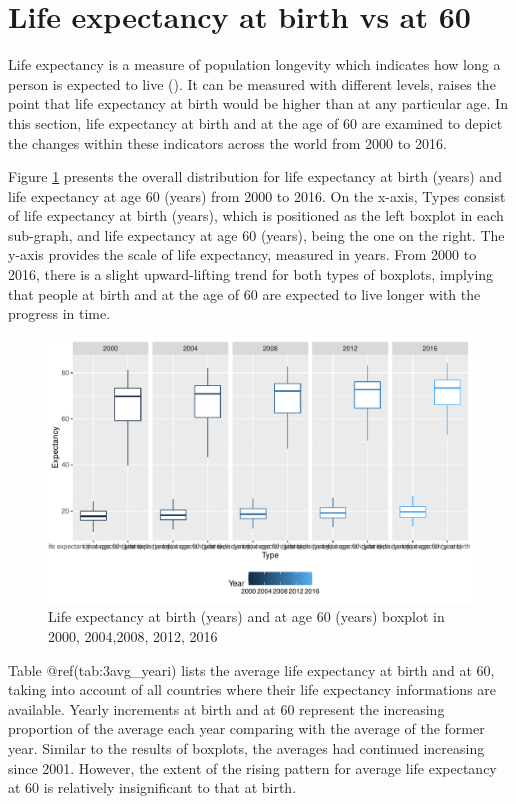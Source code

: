 \documentclass[11pt,a4paper,]{article}
\begin{document}
\section*{Life expectancy at birth vs at 60}

Life expectancy is a measure of population longevity which indicates how long a person is expected to live (\textcite{tosato2007aging}). It can be measured with different levels, \textcite{rabbi2013imbalance} raises the point that life expectancy at birth would be higher than at any particular age. In this section, life expectancy at birth and at the age of 60 are examined to depict the changes within these indicators across the world from 2000 to 2016.

Figure \ref{fig:3box} presents the overall distribution for life expectancy at birth (years) and life expectancy at age 60 (years) from 2000 to 2016. On the x-axis, Types consist of life expectancy at birth (years), which is positioned as the left boxplot in each sub-graph, and life expectancy at age 60 (years), being the one on the right. The y-axis provides the scale of life expectancy, measured in years. From 2000 to 2016, there is a slight upward-lifting trend for both types of boxplots, implying that people at birth and at the age of 60 are expected to live longer with the progress in time.

\begin{figure}
\centering
\includegraphics{ETC5513-assignment4_files/figure-latex/3box-1.pdf}
\caption{\label{fig:3box}Life expectancy at birth (years) and at age 60 (years) boxplot in 2000, 2004,2008, 2012, 2016}
\end{figure}

Table @ref(tab:3avg\_yeari) lists the average life expectancy at birth and at 60, taking into account of all countries where their life expectancy informations are available. Yearly increments at birth and at 60 represent the increasing proportion of the average each year comparing with the average of the former year. Similar to the results of boxplots, the averages had continued increasing since 2001. However, the extent of the rising pattern for average life expectancy at 60 is relatively insignificant to that at birth.
\end{document}
